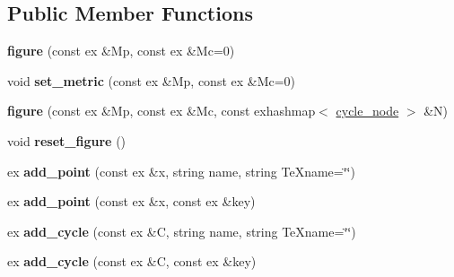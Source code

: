 \subsection*{Public Member Functions}
\begin{DoxyCompactItemize}
\item 
\mbox{\label{class_moeb_inv_1_1figure_a1344e7a1ceac3e149a541e79f36258ce}} 
{\bfseries figure} (const ex \&Mp, const ex \&Mc=0)
\item 
\mbox{\label{class_moeb_inv_1_1figure_ab7d6877e8dc49ee07baa3e4b433326c3}} 
void {\bfseries set\+\_\+metric} (const ex \&Mp, const ex \&Mc=0)
\item 
\mbox{\label{class_moeb_inv_1_1figure_a3a45a7757c4fa77c69e99f3855ef49a0}} 
{\bfseries figure} (const ex \&Mp, const ex \&Mc, const exhashmap$<$ \mbox{\hyperlink{class_moeb_inv_1_1cycle__node}{cycle\+\_\+node}} $>$ \&N)
\item 
\mbox{\label{class_moeb_inv_1_1figure_a27b411c4558e6e7ecc43c403da26dd82}} 
void {\bfseries reset\+\_\+figure} ()
\item 
\mbox{\label{class_moeb_inv_1_1figure_ac9753b10b0e1984c1b0c1e3c3c0c89aa}} 
ex {\bfseries add\+\_\+point} (const ex \&x, string name, string Te\+Xname=\char`\"{}\char`\"{})
\item 
\mbox{\label{class_moeb_inv_1_1figure_acb74979c1fa2e997cb86a882233dc028}} 
ex {\bfseries add\+\_\+point} (const ex \&x, const ex \&key)
\item 
\mbox{\label{class_moeb_inv_1_1figure_aea1fd6872531d2db356e4908cb957fd5}} 
ex {\bfseries add\+\_\+cycle} (const ex \&C, string name, string Te\+Xname=\char`\"{}\char`\"{})
\item 
\mbox{\label{class_moeb_inv_1_1figure_acfcfd11e6e2239c5a8e8821259203a77}} 
ex {\bfseries add\+\_\+cycle} (const ex \&C, const ex \&key)
\item 
\mbox{\label{class_moeb_inv_1_1figure_a8cbaae9347692e5d94214f3790a098e1}} 

\end{DoxyCompactItemize}
